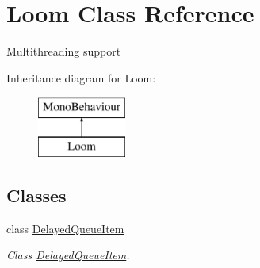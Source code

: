 \hypertarget{class_loom}{}\section{Loom Class Reference}
\label{class_loom}


Multithreading support  


Inheritance diagram for Loom\+:\begin{figure}[H]
\begin{center}
\leavevmode
\includegraphics[height=2.000000cm]{class_loom}
\end{center}
\end{figure}
\subsection*{Classes}
\begin{DoxyCompactItemize}
\item 
class \hyperlink{class_loom_1_1_delayed_queue_item}{Delayed\+Queue\+Item}
\begin{DoxyCompactList}\small\item\em Class \hyperlink{class_loom_1_1_delayed_queue_item}{Delayed\+Queue\+Item}. \end{DoxyCompactList}\end{DoxyCompactItemize}
